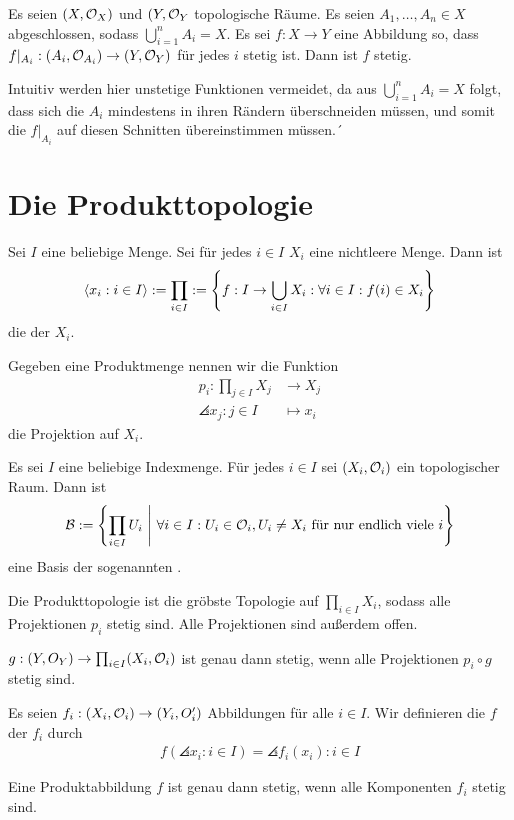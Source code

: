 \documentclass{report}
\begin{document}
\begin{theorem}
	Es seien $(X, \mathcal{O}_X)$ und $(Y, \mathcal{O}_Y$ topologische Räume. Es seien $A_1, \hdots, A_n \in X$ abgeschlossen, sodass $\bigcup_{i = 1}^n A_i = X$. Es sei $f : X \to Y$ eine Abbildung so, dass $f|_{A_i} : (A_i, \mathcal{O}_{A_i}) \to (Y, \mathcal{O}_Y)$ für jedes $i$ stetig ist. Dann ist $f$ stetig.
\end{theorem}
Intuitiv werden hier unstetige Funktionen vermeidet, da aus $\bigcup_{i = 1}^n A_i = X$ folgt, dass sich die $A_i$ mindestens in ihren Rändern überschneiden müssen, und somit die $f|_{A_i}$ auf diesen Schnitten übereinstimmen müssen.´
\section{Die Produkttopologie}
\begin{definition}
	Sei $I$ eine beliebige Menge. Sei für jedes $i \in I$ $X_i$ eine nichtleere Menge. Dann ist
	\begin{align*}
		\left\langle x_i : i \in I \right\rangle 
		:= \prod_{i \in I}
		:= \qty{f : I \to \bigcup_{i \in I} X_i : \forall i \in I : f(i) \in X_i}
	\end{align*}
	die  der $X_i$.
\end{definition}
\begin{definition}
	Gegeben eine Produktmenge nennen wir die Funktion
	\begin{align*}
		p_i : \prod_{j \in I} X_j &\to X_j\\
		\angles{x_j : j \in I} &\mapsto x_i
	\end{align*}
	die Projektion auf $X_i$.
\end{definition}
\begin{definition}
	Es sei $I$ eine beliebige Indexmenge. Für jedes $i \in I$ sei $(X_i, \mathcal{O}_i)$ ein topologischer Raum. Dann ist
	\begin{align*}
		\mathcal{B} := \qty{\prod_{i \in I} U_i ~\middle|~\forall i \in I : U_i \in \mathcal{O}_i, U_i \neq X_i \textnormal{ für nur endlich viele $i$}}
	\end{align*}
	eine Basis der sogenannten .
\end{definition}
\begin{theorem}
	Die Produkttopologie ist die gröbste Topologie auf $\prod_{i \in I} X_i$, sodass alle Projektionen $p_i$ stetig sind. Alle Projektionen sind außerdem offen. 
\end{theorem}
\begin{theorem}
	$g : (Y, O_Y) \to \prod_{i \in I} (X_i, \mathcal{O}_i)$ ist genau dann stetig, wenn alle Projektionen $p_i \circ g$ stetig sind.
\end{theorem}
\begin{definition}
	Es seien $f_i : (X_i, \mathcal{O}_i) \to (Y_i, O_i')$ Abbildungen für alle $i \in I$. Wir definieren die  $f$ der $f_i$ durch
	\begin{align*}
		f(\angles{x_i : i \in I}) = \angles{f_i(x_i) : i \in I}
	\end{align*}
\end{definition}
\begin{corollary}
	Eine Produktabbildung $f$ ist genau dann stetig, wenn alle Komponenten $f_i$ stetig sind.
\end{corollary}
\end{document}
